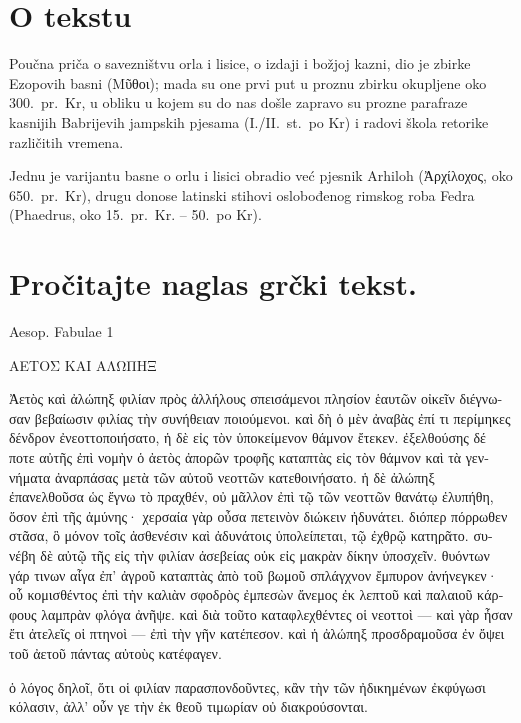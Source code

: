 


\section*{O tekstu}

Poučna priča o savezništvu orla i lisice, o izdaji i božjoj kazni, dio je zbirke Ezopovih basni \textgreek[variant=ancient]{(Μῦθοι);} mada su one prvi put u proznu zbirku okupljene oko 300.\ pr.~Kr, u obliku u kojem su do nas došle zapravo su prozne parafraze kasnijih Babrijevih jampskih pjesama (I./II.\ st.\ po Kr) i radovi škola retorike različitih vremena. 

Jednu je varijantu basne o orlu i lisici obradio već pjesnik Arhiloh \textgreek[variant=ancient]{(Ἀρχίλοχος,} oko 650.\ pr.~Kr), drugu donose latinski stihovi oslobođenog rimskog roba Fedra (Phaedrus, oko 15.\ pr.~Kr. – 50.\ po Kr).


\section*{Pročitajte naglas grčki tekst.}
Aesop. Fabulae 1

\medskip

{\large
\begin{greek}
\noindent ΑΕΤΟΣ ΚΑΙ ΑΛΩΠΗΞ

\noindent Ἀετὸς καὶ ἀλώπηξ φιλίαν πρὸς ἀλλήλους σπεισάμενοι πλησίον ἑαυτῶν οἰκεῖν διέγνωσαν βεβαίωσιν φιλίας τὴν συνήθειαν ποιούμενοι. καὶ δὴ ὁ μὲν ἀναβὰς ἐπί τι περίμηκες δένδρον ἐνεοττοποιήσατο, ἡ δὲ εἰς τὸν ὑποκείμενον θάμνον ἔτεκεν. ἐξελθούσης δέ ποτε αὐτῆς ἐπὶ νομὴν ὁ ἀετὸς ἀπορῶν τροφῆς καταπτὰς εἰς τὸν θάμνον καὶ τὰ γεννήματα ἀναρπάσας μετὰ τῶν αὑτοῦ νεοττῶν κατεθοινήσατο. ἡ δὲ ἀλώπηξ ἐπανελθοῦσα ὡς ἔγνω τὸ πραχθέν, οὐ μᾶλλον ἐπὶ τῷ τῶν νεοττῶν θανάτῳ ἐλυπήθη, ὅσον ἐπὶ τῆς ἀμύνης· χερσαία γὰρ οὖσα πετεινὸν διώκειν ἠδυνάτει. διόπερ πόρρωθεν στᾶσα, ὃ μόνον τοῖς ἀσθενέσιν καὶ ἀδυνάτοις ὑπολείπεται, τῷ ἐχθρῷ κατηρᾶτο. συνέβη δὲ αὐτῷ τῆς εἰς τὴν φιλίαν ἀσεβείας οὐκ εἰς μακρὰν δίκην ὑποσχεῖν. θυόντων γάρ τινων αἶγα ἐπ' ἀγροῦ καταπτὰς ἀπὸ τοῦ βωμοῦ σπλάγχνον ἔμπυρον ἀνήνεγκεν· οὗ κομισθέντος ἐπὶ τὴν καλιὰν σφοδρὸς ἐμπεσὼν ἄνεμος ἐκ λεπτοῦ καὶ παλαιοῦ κάρφους λαμπρὰν φλόγα ἀνῆψε. καὶ διὰ τοῦτο καταφλεχθέντες οἱ νεοττοὶ — καὶ γὰρ ἦσαν ἔτι ἀτελεῖς οἱ πτηνοὶ — ἐπὶ τὴν γῆν κατέπεσον. καὶ ἡ ἀλώπηξ προσδραμοῦσα ἐν ὄψει τοῦ ἀετοῦ πάντας αὐτοὺς κατέφαγεν. 

ὁ λόγος δηλοῖ, ὅτι οἱ φιλίαν παρασπονδοῦντες, κἂν τὴν τῶν ἠδικημένων ἐκφύγωσι κόλασιν, ἀλλ' οὖν γε τὴν ἐκ θεοῦ τιμωρίαν οὐ διακρούσονται.

\end{greek}
}

